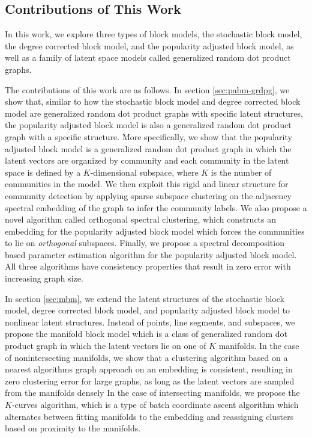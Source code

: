 \documentclass[
  12pt,
]{article}
\theoremstyle{definition}
\theoremstyle{definition}
\theoremstyle{definition}
\theoremstyle{definition}
\theoremstyle{remark}
\begin{document}
\hypertarget{contributions-of-this-work}{%
\subsection{Contributions of This Work}\label{contributions-of-this-work}}

In this work, we explore three types of block models, the stochastic block model, the degree corrected block model, and the popularity adjusted block model, as well as a family of latent space models called generalized random dot product graphs.

The contributions of this work are as follows.
In section \ref{sec:pabm-grdpg}, we show that, similar to how the stochastic block model and degree corrected block model are generalized random dot product graphs with specific latent structures, the popularity adjusted block model is also a generalized random dot product graph with a specific structure.
More specifically, we show that the popularity adjusted block model is a generalized random dot product graph in which the latent vectors are organized by community and each community in the latent space is defined by a \(K\)-dimensional subspace, where \(K\) is the number of communities in the model.
We then exploit this rigid and linear structure for community detection by applying sparse subspace clustering on the adjacency spectral embedding of the graph to infer the community labels.
We also propose a novel algorithm called orthogonal spectral clustering, which constructs an embedding for the popularity adjusted block model which forces the communities to lie on \emph{orthogonal} subspaces.
Finally, we propose a spectral decomposition based parameter estimation algorithm for the popularity adjusted block model.
All three algorithms have consistency properties that result in zero error with increasing graph size.

In section \ref{sec:mbm}, we extend the latent structures of the stochastic block model, degree corrected block model, and popularity adjusted block model to nonlinear latent structures.
Instead of points, line segments, and subspaces, we propose the manifold block model which is a class of generalized random dot product graph in which the latent vectors lie on one of \(K\) manifolds.
In the case of nonintersecting manifolds, we show that a clustering algorithm based on a nearest algorithms graph approach on an embedding is consistent, resulting in zero clustering error for large graphs, as long as the latent vectors are sampled from the manifolds densely
In the case of intersecting manifolds, we propose the \(K\)-curves algorithm, which is a type of batch coordinate ascent algorithm which alternates between fitting manifolds to the embedding and reassigning clusters based on proximity to the manifolds.
\end{document}
